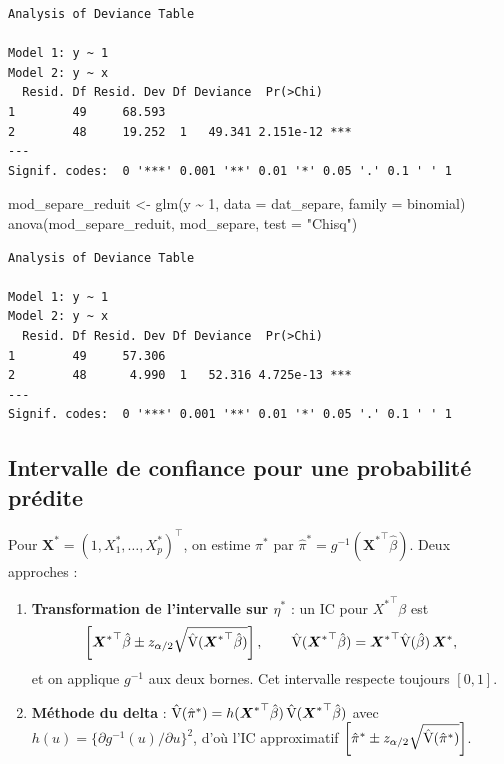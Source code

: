 \documentclass[
  french,
  letterpaper,
  DIV=11,
  numbers=noendperiod]{scrreprt}
\newenvironment{Shaded}{\begin{snugshade}}{\end{snugshade}}
\newcommand{\AttributeTok}[1]{\textcolor[rgb]{0.40,0.45,0.13}{#1}}
\newcommand{\DecValTok}[1]{\textcolor[rgb]{0.68,0.00,0.00}{#1}}
\newcommand{\FunctionTok}[1]{\textcolor[rgb]{0.28,0.35,0.67}{#1}}
\newcommand{\NormalTok}[1]{\textcolor[rgb]{0.00,0.23,0.31}{#1}}
\newcommand{\OtherTok}[1]{\textcolor[rgb]{0.00,0.23,0.31}{#1}}
\newcommand{\SpecialCharTok}[1]{\textcolor[rgb]{0.37,0.37,0.37}{#1}}
\newcommand{\StringTok}[1]{\textcolor[rgb]{0.13,0.47,0.30}{#1}}
\begin{document}
\begin{verbatim}
Analysis of Deviance Table

Model 1: y ~ 1
Model 2: y ~ x
  Resid. Df Resid. Dev Df Deviance  Pr(>Chi)    
1        49     68.593                          
2        48     19.252  1   49.341 2.151e-12 ***
---
Signif. codes:  0 '***' 0.001 '**' 0.01 '*' 0.05 '.' 0.1 ' ' 1
\end{verbatim}

\begin{Shaded}
\begin{Highlighting}[]
\NormalTok{mod\_separe\_reduit }\OtherTok{\textless{}{-}} \FunctionTok{glm}\NormalTok{(y }\SpecialCharTok{\textasciitilde{}} \DecValTok{1}\NormalTok{, }\AttributeTok{data =}\NormalTok{ dat\_separe, }\AttributeTok{family =}\NormalTok{ binomial)}
\FunctionTok{anova}\NormalTok{(mod\_separe\_reduit, mod\_separe, }\AttributeTok{test =} \StringTok{"Chisq"}\NormalTok{)}
\end{Highlighting}
\end{Shaded}

\begin{verbatim}
Analysis of Deviance Table

Model 1: y ~ 1
Model 2: y ~ x
  Resid. Df Resid. Dev Df Deviance  Pr(>Chi)    
1        49     57.306                          
2        48      4.990  1   52.316 4.725e-13 ***
---
Signif. codes:  0 '***' 0.001 '**' 0.01 '*' 0.05 '.' 0.1 ' ' 1
\end{verbatim}

\subsection{Intervalle de confiance pour une probabilité
prédite}\label{intervalle-de-confiance-pour-une-probabilituxe9-pruxe9dite}

Pour \(\boldsymbol{X}^* = (1, X_1^*,\ldots,X_p^*)^\top\), on estime
\(\pi^*\) par \(\hat\pi^* = g^{-1}({\boldsymbol{X}^*}^\top\hat\beta)\).
Deux approches :

\begin{enumerate}
\def\labelenumi{\arabic{enumi}.}
\item
  \textbf{Transformation de l'intervalle sur \(\eta^*\)} : un IC pour
  \({X^*}^\top\beta\) est
  \[\left[{\boldsymbol{X}^*}^\top\hat\beta \pm z_{\alpha/2}\sqrt{\hat{\text V}({\boldsymbol{X}^*}^\top\hat\beta)}\right], \qquad \hat{\text V}({\boldsymbol{X}^*}^\top\hat\beta) = {\boldsymbol{X}^*}^\top \hat{\text V}(\hat\beta)\, \boldsymbol{X}^*,\]
  et on applique \(g^{-1}\) aux deux bornes. Cet intervalle respecte
  toujours \([0,1]\).
\item
  \textbf{Méthode du delta} :
  \(\hat{\text V}(\hat\pi^*) = h({\boldsymbol{X}^*}^\top\hat\beta)\, \hat{\text V}({\boldsymbol{X}^*}^\top\hat\beta)\)
  avec \(h(u) = \{\partial g^{-1}(u)/\partial u\}^2\), d'où l'IC
  approximatif
  \(\left[\hat\pi^* \pm z_{\alpha/2}\sqrt{\hat{\text V}(\hat\pi^*)}\right]\).
\end{enumerate}
\end{document}
